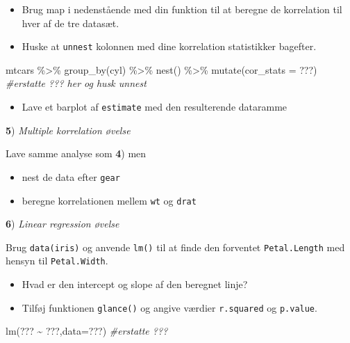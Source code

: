 \documentclass[
]{book}
\newenvironment{Shaded}{\begin{snugshade}}{\end{snugshade}}
\newcommand{\AttributeTok}[1]{\textcolor[rgb]{0.77,0.63,0.00}{#1}}
\newcommand{\CommentTok}[1]{\textcolor[rgb]{0.56,0.35,0.01}{\textit{#1}}}
\newcommand{\FunctionTok}[1]{\textcolor[rgb]{0.00,0.00,0.00}{#1}}
\newcommand{\NormalTok}[1]{#1}
\newcommand{\SpecialCharTok}[1]{\textcolor[rgb]{0.00,0.00,0.00}{#1}}
\providecommand{\tightlist}{%
  \setlength{\itemsep}{0pt}\setlength{\parskip}{0pt}}
\begin{document}
\begin{itemize}
\tightlist
\item
  Brug map i nedenstående med din funktion til at beregne de korrelation til hver af de tre datasæt.
\item
  Huske at \texttt{unnest} kolonnen med dine korrelation statistikker bagefter.
\end{itemize}

\begin{Shaded}
\begin{Highlighting}[]
\NormalTok{mtcars }\SpecialCharTok{\%\textgreater{}\%} 
  \FunctionTok{group\_by}\NormalTok{(cyl) }\SpecialCharTok{\%\textgreater{}\%} 
  \FunctionTok{nest}\NormalTok{() }\SpecialCharTok{\%\textgreater{}\%}
  \FunctionTok{mutate}\NormalTok{(}\AttributeTok{cor\_stats =}\NormalTok{ ???) }\CommentTok{\#erstatte ??? her og husk unnest}
\end{Highlighting}
\end{Shaded}

\begin{itemize}
\tightlist
\item
  Lave et barplot af \texttt{estimate} med den resulterende dataramme
\end{itemize}

\textbf{5}) \emph{Multiple korrelation øvelse}

Lave samme analyse som \textbf{4}) men

\begin{itemize}
\tightlist
\item
  nest de data efter \texttt{gear}
\item
  beregne korrelationen mellem \texttt{wt} og \texttt{drat}
\end{itemize}

\textbf{6}) \emph{Linear regression øvelse}

Brug \texttt{data(iris)} og anvende \texttt{lm()} til at finde den forventet \texttt{Petal.Length} med hensyn til \texttt{Petal.Width}.

\begin{itemize}
\tightlist
\item
  Hvad er den intercept og slope af den beregnet linje?
\item
  Tilføj funktionen \texttt{glance()} og angive værdier \texttt{r.squared} og \texttt{p.value}.
\end{itemize}

\begin{Shaded}
\begin{Highlighting}[]
\FunctionTok{lm}\NormalTok{(??? }\SpecialCharTok{\textasciitilde{}}\NormalTok{ ???,}\AttributeTok{data=}\NormalTok{???) }\CommentTok{\#erstatte ???}
\end{Highlighting}
\end{Shaded}
\end{document}
